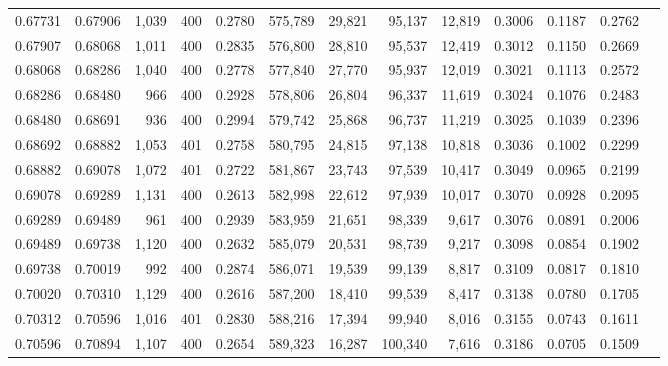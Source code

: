 \begin{tabular}{rrrrrrrrrrrrr}
0.67731 & 0.67906 & 1,039 & 400 &                                     0.2780 & 575,789 &  29,821 &  95,137 &  12,819 & 0.3006 & 0.1187 & 0.2762 \\
0.67907 & 0.68068 & 1,011 & 400 &                                     0.2835 & 576,800 &  28,810 &  95,537 &  12,419 & 0.3012 & 0.1150 & 0.2669 \\
0.68068 & 0.68286 & 1,040 & 400 &                                     0.2778 & 577,840 &  27,770 &  95,937 &  12,019 & 0.3021 & 0.1113 & 0.2572 \\
0.68286 & 0.68480 &   966 & 400 &                                     0.2928 & 578,806 &  26,804 &  96,337 &  11,619 & 0.3024 & 0.1076 & 0.2483 \\
0.68480 & 0.68691 &   936 & 400 &                                     0.2994 & 579,742 &  25,868 &  96,737 &  11,219 & 0.3025 & 0.1039 & 0.2396 \\
0.68692 & 0.68882 & 1,053 & 401 &                                     0.2758 & 580,795 &  24,815 &  97,138 &  10,818 & 0.3036 & 0.1002 & 0.2299 \\
0.68882 & 0.69078 & 1,072 & 401 &                                     0.2722 & 581,867 &  23,743 &  97,539 &  10,417 & 0.3049 & 0.0965 & 0.2199 \\
0.69078 & 0.69289 & 1,131 & 400 &                                     0.2613 & 582,998 &  22,612 &  97,939 &  10,017 & 0.3070 & 0.0928 & 0.2095 \\
0.69289 & 0.69489 &   961 & 400 &                                     0.2939 & 583,959 &  21,651 &  98,339 &   9,617 & 0.3076 & 0.0891 & 0.2006 \\
0.69489 & 0.69738 & 1,120 & 400 &                                     0.2632 & 585,079 &  20,531 &  98,739 &   9,217 & 0.3098 & 0.0854 & 0.1902 \\
0.69738 & 0.70019 &   992 & 400 &                                     0.2874 & 586,071 &  19,539 &  99,139 &   8,817 & 0.3109 & 0.0817 & 0.1810 \\
0.70020 & 0.70310 & 1,129 & 400 &                                     0.2616 & 587,200 &  18,410 &  99,539 &   8,417 & 0.3138 & 0.0780 & 0.1705 \\
0.70312 & 0.70596 & 1,016 & 401 &                                     0.2830 & 588,216 &  17,394 &  99,940 &   8,016 & 0.3155 & 0.0743 & 0.1611 \\
0.70596 & 0.70894 & 1,107 & 400 &                                     0.2654 & 589,323 &  16,287 & 100,340 &   7,616 & 0.3186 & 0.0705 & 0.1509 \\

\end{tabular}
